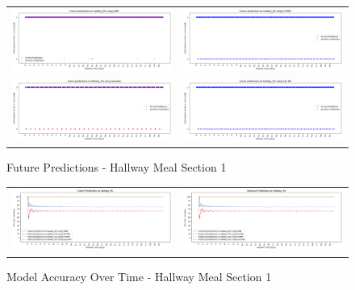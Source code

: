 \begin{figure}
  \begin{tabular}{cc}
    {\includegraphics[width = 3in]{images/results/Future_hallway_M1_DMM.png}} &
    {\includegraphics[width = 3in]{images/results/Future_hallway_M1_FreMEn.png}} \\
    {\includegraphics[width = 3in]{images/results/Future_hallway_M1_Gaussian.png}} &
    {\includegraphics[width = 3in]{images/results/Future_hallway_M1_HyT-EM.png}} \\
  \end{tabular}
  \caption{Future Predictions - Hallway Meal Section 1}
\end{figure}

\begin{figure}
  \begin{tabular}{cc}
    {\includegraphics[width = 3in]{images/results/Future_Predictions_on_hallway_M1.png}} &
    {\includegraphics[width = 3in]{images/results/Historical_Predictions_on_hallway_M1.png}} \\
  \end{tabular}
  \caption{Model Accuracy Over Time - Hallway Meal Section 1}
\end{figure}



